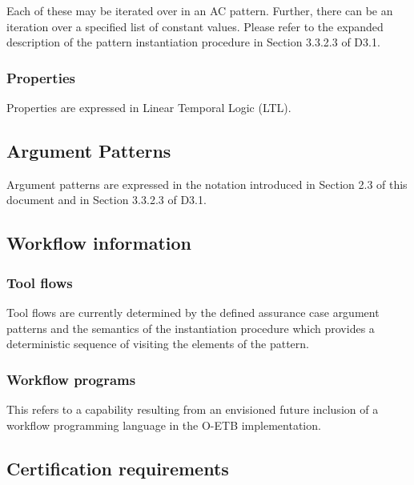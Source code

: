 \documentclass[12pt,twoside,a4paper]{article}
\begin{document}
Each of these may be iterated over in an AC pattern. Further, there can be an iteration over a specified list of constant values. Please refer to the expanded description of the pattern instantiation procedure in Section 3.3.2.3 of D3.1.

\hypertarget{properties}{%
\subsubsection{Properties}\label{properties}}

Properties are expressed in Linear Temporal Logic (LTL).

\hypertarget{argument-patterns}{%
\subsection{Argument Patterns}\label{argument-patterns}}

Argument patterns are expressed in the notation introduced in Section 2.3 of this document and in Section 3.3.2.3 of D3.1.

\hypertarget{workflow-information}{%
\subsection{Workflow information}\label{workflow-information}}

\hypertarget{tool-flows}{%
\subsubsection{Tool flows}\label{tool-flows}}

Tool flows are currently determined by the defined assurance case argument patterns and the semantics of the instantiation procedure which provides a deterministic sequence of visiting the elements of the pattern.

\hypertarget{workflow-programs}{%
\subsubsection{Workflow programs}\label{workflow-programs}}

This refers to a capability resulting from an envisioned future inclusion of a workflow programming language in the O-ETB implementation.

\hypertarget{certification-requirements}{%
\subsection{Certification requirements}\label{certification-requirements}}
\end{document}

